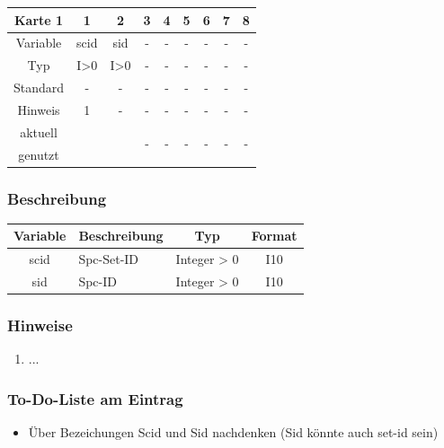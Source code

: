 \documentclass[11pt,titlepage,listof=totoc,bibliography=totoc,twoside]{scrreprt}
\begin{document}
{{\begin{table}[htbp]
\centering
\begin{tabularx}{\textwidth}{cCCCCCCCC}
\toprule
Karte 1	& 1		& 2		& 3		& 4		& 5		& 6		& 7		& 8		\\
\midrule
Variable& scid		& sid		& -		& -		& -		& -		& -		& -		\\
Typ	& I>0		& I>0		& -		& -		& -		& -		& -		& -		\\
Standard& -		& -		& -		& -		& -		& -		& -		& -		\\
Hinweis	& 1		& -		& -		& -		& -		& -		& -		& -		\\
aktuell	& 	& 	& 	& 	& 	& \multirow{2}{*}{-}	& 	& 	\\
genutzt \\
\bottomrule
\end{tabularx}
\end{table}

\subsubsection{Beschreibung}

\begin{tabularx}{\textwidth}{cXcc}
\toprule
Variable& Beschreibung		& Typ		& Format\\
\midrule
scid	& Spc-Set-ID		& Integer > 0	& I10	\\
sid	& Spc-ID		& Integer > 0	& I10	\\
\bottomrule
\end{tabularx}

\subsubsection{Hinweise}

\begin{enumerate}
\item ...
\end{enumerate}

\subsubsection{To-Do-Liste am Eintrag}

\begin{itemize}
\item Über Bezeichungen Scid und Sid nachdenken (Sid könnte auch set-id sein)
\end{itemize}

}}
\end{document}
